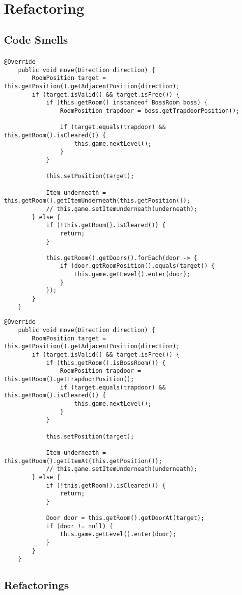 \chapter{Refactoring}

\section{Code Smells}

\subsection*{}
\vspace{0.5cm}
\begin{lstlisting}[caption={Code Smell I (Vorher)}]
    @Override
    public void move(Direction direction) {
        RoomPosition target = this.getPosition().getAdjacentPosition(direction);
        if (target.isValid() && target.isFree()) {
            if (this.getRoom() instanceof BossRoom boss) {
                RoomPosition trapdoor = boss.getTrapdoorPosition();
                
                if (target.equals(trapdoor) && this.getRoom().isCleared()) {
                    this.game.nextLevel();
                }
            }
            
            this.setPosition(target);
            
            Item underneath = this.getRoom().getItemUnderneath(this.getPosition());
            // this.game.setItemUnderneath(underneath);
        } else {
            if (!this.getRoom().isCleared()) {
                return;
            }
            
            this.getRoom().getDoors().forEach(door -> {
                if (door.getRoomPosition().equals(target)) {
                    this.game.getLevel().enter(door);
                }
            });
        }
    }
\end{lstlisting}

\vspace{0.5cm}
\begin{lstlisting}[caption={Code Smell I (Nachher)}]
    @Override
    public void move(Direction direction) {
        RoomPosition target = this.getPosition().getAdjacentPosition(direction);
        if (target.isValid() && target.isFree()) {
            if (this.getRoom().isBossRoom()) {
                RoomPosition trapdoor = this.getRoom().getTrapdoorPosition();
                if (target.equals(trapdoor) && this.getRoom().isCleared()) {
                    this.game.nextLevel();
                }
            }
            
            this.setPosition(target);
            
            Item underneath = this.getRoom().getItemAt(this.getPosition());
            // this.game.setItemUnderneath(underneath);
        } else {
            if (!this.getRoom().isCleared()) {
                return;
            }
            
            Door door = this.getRoom().getDoorAt(target);
            if (door != null) {
                this.game.getLevel().enter(door);
            }
        }
    }
\end{lstlisting}


\section{Refactorings}